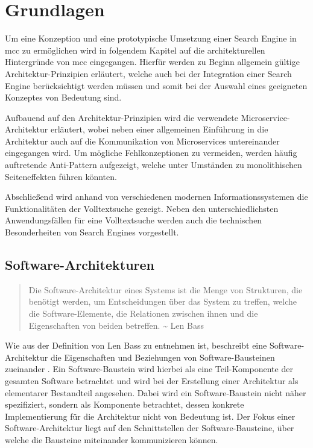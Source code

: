 \chapter{Grundlagen\label{chap2:Zweites-Kapitel}}

Um eine Konzeption und eine prototypische Umsetzung einer Search Engine in \gls{mcc} zu ermöglichen wird in folgendem Kapitel auf die architekturellen Hintergründe von \gls{mcc} eingegangen. Hierfür werden zu Beginn allgemein gültige Architektur-Prinzipien erläutert, welche auch bei der Integration einer Search Engine berücksichtigt werden müssen und somit bei der Auswahl eines geeigneten Konzeptes von Bedeutung sind.

Aufbauend auf den Architektur-Prinzipien wird die verwendete Microservice-Architektur erläutert, wobei neben einer allgemeinen Einführung in die Architektur auch auf die Kommunikation von Microservices untereinander eingegangen wird. Um mögliche Fehlkonzeptionen zu vermeiden, werden häufig auftretende Anti-Pattern aufgezeigt, welche unter Umständen zu monolithischen Seiteneffekten führen könnten.

Abschließend wird anhand von verschiedenen modernen Informationssystemen die Funktionalitäten der Volltextsuche gezeigt. Neben den unterschiedlichsten Anwendungsfällen für eine Volltextsuche werden auch die technischen Besonderheiten von Search Engines vorgestellt.

\section{Software-Architekturen\label{sec2.1:Unterpunkt-1}}

\begin{quote}
    Die Software-Architektur eines Systems ist die Menge von Strukturen, die benötigt werden, um Entscheidungen über das System zu treffen, welche die Software-Elemente, die Relationen zwischen ihnen und die Eigenschaften von beiden betreffen. \textasciitilde{} Len Bass \cite{Bass.2013}
\end{quote}

Wie aus der Definition von Len Bass zu entnehmen ist, beschreibt eine Software-Architektur die Eigenschaften und Beziehungen von Software-Bausteinen zueinander \cite{Bass.2013}. Ein Software-Baustein wird hierbei als eine Teil-Komponente der gesamten Software betrachtet und wird bei der Erstellung einer Architektur als elementarer Bestandteil angesehen. Dabei wird ein Software-Baustein nicht näher spezifiziert, sondern als Komponente betrachtet, dessen konkrete Implementierung für die Architektur nicht von Bedeutung ist. Der Fokus einer Software-Architektur liegt auf den Schnittstellen der Software-Bausteine, über welche die Bausteine miteinander kommunizieren können.

